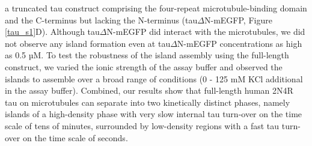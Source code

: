 a truncated tau construct comprising the four-repeat microtubule-binding domain and the C-terminus but lacking the N-terminus (tau$\Delta$N-mEGFP, Figure \ref{tau_s1}D). Although tau$\Delta$N-mEGFP did interact with the microtubules, we did not observe any island formation even at tau$\Delta$N-mEGFP concentrations as high as 0.5 µM. To test the robustness of the island assembly using the full-length construct, we varied the ionic strength of the assay buffer and observed the islands to assemble over a broad range of conditions (0 - 125 mM KCl additional in the assay buffer). Combined, our results show that full-length human 2N4R tau on microtubules can separate into two kinetically distinct phases, namely islands of a high-density phase with very slow internal tau turn-over on the time scale of tens of minutes, surrounded by low-density regions with a fast tau turn-over on the time scale of seconds.

